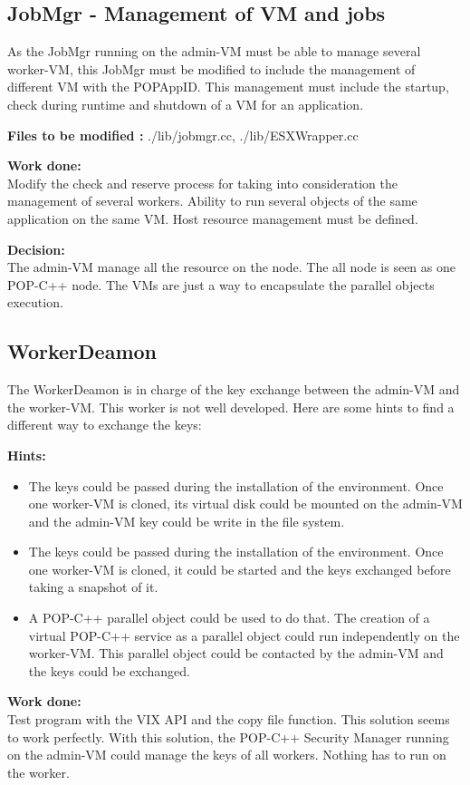 \subsection{JobMgr - Management of VM and jobs}
As the JobMgr running on the admin-VM must be able to manage several worker-VM, this JobMgr must be modified to include the management of different VM with the POPAppID. This management must include the startup, check during runtime and shutdown of a VM for an application.\s

\textbf{Files to be modified : } ./lib/jobmgr.cc, ./lib/ESXWrapper.cc\s

\textbf{Work done:}\\
Modify the check and reserve process for taking into consideration the management of several workers. Ability to run several objects of the same application on the same VM. Host resource management must be defined. \s

\textbf{Decision:}\\
The admin-VM manage all the resource on the node. The all node is seen as one POP-C++ node. The VMs are just a way to encapsulate the parallel objects execution.

\subsection{WorkerDeamon}
The WorkerDeamon is in charge of the key exchange between the admin-VM and the worker-VM. This worker is not well developed. Here are some hints to find a different way to exchange the keys:\s

\textbf{Hints:} 
\begin{itemize}
\item The keys could be passed during the installation of the environment. Once one worker-VM is cloned, its virtual disk could be mounted on the admin-VM and the admin-VM key could be write in the file system.
\item The keys could be passed during the installation of the environment. Once one worker-VM is cloned, it could be started and the keys exchanged before taking a snapshot of it. 
\item A POP-C++ parallel object could be used to do that. The creation of a virtual POP-C++ service as a parallel object could run independently on the worker-VM. This parallel object could be contacted by the admin-VM and the keys could be exchanged.
\end{itemize}

\textbf{Work done:}\\
Test program with the VIX API and the copy file function. This solution seems to work perfectly. With this solution, the POP-C++ Security Manager running on the admin-VM could manage the keys of all workers. Nothing has to run on the worker. \s

